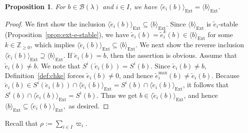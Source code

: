 \documentclass[reqno]{amsart}
\newtheorem{proposition}[theorem]{Proposition}
\theoremstyle{definition}
\theoremstyle{remark}
\numberwithin{equation}{section}
\newcommand{\B}{\mathcal{B}}
\newcommand{\Ext}{\operatorname{Ext}}
\newcommand{\te}{\tilde e}
\newcommand{\chke}{\check e}
\newcommand{\Bl}{\B(\lambda)}
\begin{document}
	\begin{proposition}\label{prop:chke-invariant}
		For $b\in\Bl$ and $i\in I$,
		we have $\langle\chke_i(b)\rangle_{\Ext}=\langle b\rangle_{\Ext}$.
	\end{proposition}
	\begin{proof}
		We first show the inclusion $\langle\chke_i(b)\rangle_{\Ext}\subseteq\langle b\rangle_{\Ext}$.
		Since $\langle b\rangle_{\Ext}$ is $\te_i$-stable (Proposition~\ref{prop:ext-e-stable}), 
		we have $\chke_i(b)=\te_i^k(b)\in\langle b\rangle_{\Ext}$ for some $k\in\mathbb{Z}_{\ge 0}$,
		which implies
		$\langle\chke_i(b)\rangle_{\Ext}\subseteq\langle b\rangle_{\Ext}$.
		We next show the reverse inclusion $\langle\chke_i(b)\rangle_{\Ext}\supseteq\langle b\rangle_{\Ext}$.
		If $\chke_{i}(b)=b$,
		then the assertion is obvious.
		Assume that $\chke_{i}(b)\ne b$.
		We note that $S^i(\chke_{i}(b))=S^i(b)$.
		Since $\chke_i(b)\ne b$, Definition~\ref{def:chke} forces $\te_i(b)\ne0$,
		and hence $\te_i^{\max}(b)\ne\chke_{i}(b)$.
		Because $\chke_{i}(b)\in S^i(\chke_{i}(b))\cap\langle\chke_i(b)\rangle_{\Ext}=S^i(b)\cap\langle\chke_i(b)\rangle_{\Ext}$,
		it follows that
		$S^i(b)\cap\langle\chke_i(b)\rangle_{\Ext}=S^i(b)$.
		Thus we get $b\in\langle\chke_i(b)\rangle_{\Ext}$,
		and hence
		$\langle b\rangle_{\Ext}\subseteq\langle\chke_i(b)\rangle_{\Ext},$
		as desired.
	\end{proof}
	
	Recall that $\rho:=\sum_{i\in I}\varpi_i$.
	
\end{document}
